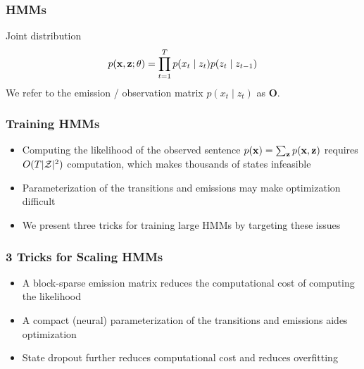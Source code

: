 \documentclass{beamer}
\begin{document}
\begin{frame}
\frametitle{HMMs}

\begin{center}
\end{center}


Joint distribution
\begin{equation*}
p(\mathbf{x}, \mathbf{z}; \theta)
= \prod_{t=1}^T p(x_t\mid z_t)p(z_t \mid z_{t-1})
\end{equation*}
We refer to the emission / observation matrix $p(x_t \mid z_t)$ as $\mathbf{O}$.
\end{frame}

\begin{frame}
\frametitle{Training HMMs}
\begin{itemize}
\item Computing the likelihood of the observed sentence
$p(\mathbf{x}) = \sum_{\mathbf{z}}p(\mathbf{x},\mathbf{z})$ requires $O(T|\mathcal{Z}|^2)$ computation,
which makes thousands of states infeasible
\item Parameterization of the transitions and emissions may make optimization
    difficult
\item We present three tricks for training large HMMs
    by targeting these issues
\end{itemize}
\end{frame}

\begin{frame}
\frametitle{3 Tricks for Scaling HMMs}
\begin{itemize}
\item A block-sparse emission matrix reduces the computational cost of computing the likelihood
\item A compact (neural) parameterization of the transitions and emissions
    aides optimization
\item State dropout further reduces computational cost and reduces overfitting
\end{itemize}
\end{frame}
\end{document}
